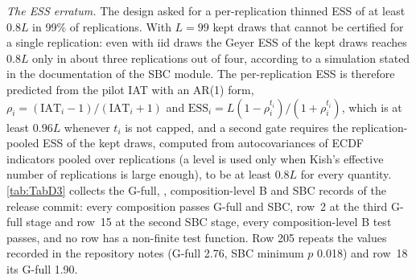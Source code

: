 \emph{The ESS erratum.}
The design asked for a per-replication thinned ESS of at least $0.8L$ in 99\% of replications.
With $L = 99$ kept draws that cannot be certified for a single replication: even with iid draws the
Geyer ESS of the kept draws reaches $0.8L$ only in about three replications out of four, according
to a simulation stated in the documentation of the SBC module.
The per-replication ESS is therefore predicted from the pilot IAT with an AR(1) form, $\rho_i =
(\mathrm{IAT}_i - 1)/(\mathrm{IAT}_i + 1)$ and $\mathrm{ESS}_i = L(1 - \rho_i^{t_i})/(1 +
\rho_i^{t_i})$, which is at least $0.96L$ whenever $t_i$ is not capped, and a second gate requires
the replication-pooled ESS of the kept draws, computed from autocovariances of ECDF indicators pooled
over replications (a level is used only when Kish's effective number of replications is large
enough), to be at least $0.8L$ for every quantity.
\cref{tab:TabD3} collects the G-full, , composition-level B and SBC records of
the release commit: every composition passes G-full and SBC, row~2 at the third G-full stage and
row~15 at the second SBC stage, every composition-level B test passes, and no 
row has a non-finite test function. Row 205 repeats the values recorded in the repository notes
(G-full 2.76, SBC minimum $p$ 0.018) and row~18 its G-full 1.90.

\begin{table}[!htbp]
\centering\small
\caption{G-full, the recorded  rows, composition-level Tier~B and full SBC per
composition on the release commit: maximum $|z|$ or minimum $p$ and stage, Tier~B tests passed,
the thinning cap and the largest thinning used, the number of replications failing the
per-replication ESS rule, and the pooled ESS.}
\label{tab:TabD3}

\end{table}

